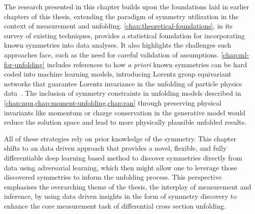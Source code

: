     The research presented in this chapter builds upon the foundations laid in earlier chapters of this thesis, extending the paradigm of symmetry utilization in the context of measurement and unfolding.
    \cref{chap:theoretical-foundations}, in its survey of existing techniques, provides a statistical foundation for incorporating known symmetries into data analyses.
    It also highlights the challenges such approaches face, such as the need for careful validation of assumptions.
    \cref{chap:ml-for-unfolding} includes references to how \textit{a priori} known symmetries can be hard coded into machine learning models, introducing Lorentz group equivariant networks that guarantee Lorentz invariance in the unfolding of particle physics data~\cite{Bogatskiy:2020tje}.
    The inclusion of symmetry constraints in unfolding models described in \cref{chap:npu,chap:moment-unfolding,chap:ran} through preserving physical invariants like momentum or charge conservation in the generative model would reduce the solution space and lead to more physically plausible unfolded results.
    
    All of these strategies rely on prior knowledge of the symmetry.
    This chapter shifts to an data driven approach that provides a novel, flexible, and fully differentiable deep learning based method to discover symmetries directly from data using adversarial learning, which then might allow one to leverage those discovered symmetries to inform the unfolding process.
    This perspective emphasises the overarching theme of the thesis, the interplay of measurement and inference, by using data driven insights in the form of symmetry discovery to enhance the core measurement task of differential cross section unfolding.

